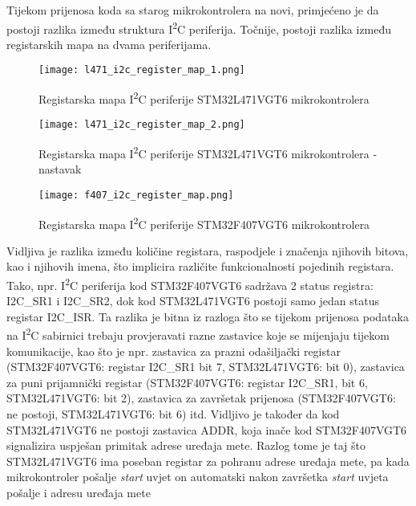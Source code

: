 Tijekom prijenosa koda sa starog mikrokontrolera na novi, primjećeno je da postoji razlika između struktura I\textsuperscript{2}C periferija. Točnije, postoji razlika između registarskih mapa na dvama periferijama.
\begin{figure}[H]
	\centering
	\texttt{[image: l471\_i2c\_register\_map\_1.png]}
	\caption{Registarska mapa I\textsuperscript{2}C periferije STM32L471VGT6
	mikrokontrolera \cite{l471_manual}}
	\label{fig:l471_i2c_register_map_1}
\end{figure}
\begin{figure}[H]
	\centering
	\texttt{[image: l471\_i2c\_register\_map\_2.png]}
	\caption{Registarska mapa I\textsuperscript{2}C periferije STM32L471VGT6
	mikrokontrolera - nastavak \cite{l471_manual}}
	\label{fig:l471_i2c_register_map_1407_i2c_diagram}
\end{figure}
\begin{figure}[H]
	\centering
	\texttt{[image: f407\_i2c\_register\_map.png]}
	\caption{Registarska mapa I\textsuperscript{2}C periferije STM32F407VGT6
	mikrokontrolera\cite{f407_manual}}
	\label{fig:f407_i2c_diagram}
\end{figure}
Vidljiva je razlika između količine registara, raspodjele i značenja njihovih bitova, kao i njihovih imena, što implicira različite funkcionalnosti pojedinih registara. Tako, npr. I\textsuperscript{2}C periferija kod STM32F407VGT6 sadržava 2 status registra: I2C\_SR1 i I2C\_SR2, dok kod STM32L471VGT6 postoji samo jedan status registar I2C\_ISR. Ta razlika je bitna iz razloga što se tijekom prijenosa podataka na I\textsuperscript{2}C sabirnici trebaju provjeravati razne zastavice koje se mijenjaju tijekom komunikacije, kao što je npr. zastavica za prazni odašiljački registar (STM32F407VGT6: registar I2C\_SR1 bit 7, STM32L471VGT6: bit 0), zastavica za puni prijamnički registar (STM32F407VGT6: registar I2C\_SR1, bit 6, STM32L471VGT6: bit 2), zastavica za završetak prijenosa (STM32F407VGT6: ne postoji, STM32L471VGT6: bit 6) itd. Vidljivo je također da kod STM32L471VGT6 ne postoji zastavica ADDR, koja inače kod STM32F407VGT6 signalizira uspješan primitak adrese uređaja mete. Razlog tome je taj što STM32L471VGT6 ima poseban registar za pohranu adrese uređaja mete, pa kada mikrokontroler pošalje \textit{start} uvjet on automatski nakon završetka \textit{start} uvjeta pošalje i adresu uređaja mete 